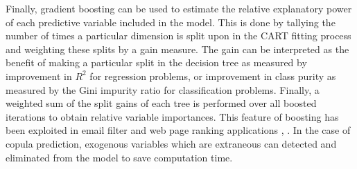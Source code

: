 Finally, gradient boosting can be used to estimate the relative explanatory power of each predictive variable included in the model.  This is done by tallying the number of times a particular dimension is split upon in the CART fitting process and weighting these splits by a gain measure.  The gain can be interpreted as the benefit of making a particular split in the decision tree as measured by improvement in $R^2$ for regression problems, or improvement in class purity as measured by the Gini impurity ratio for classification problems.  Finally, a weighted sum of the split gains of each tree is performed over all boosted iterations to obtain relative variable importances.  This feature of boosting has been exploited in email filter and web page ranking applications \cite{chapelle2011}, \cite{Tyree2011}.  In the case of copula prediction, exogenous variables which are extraneous can detected and eliminated from the model to save computation time.
